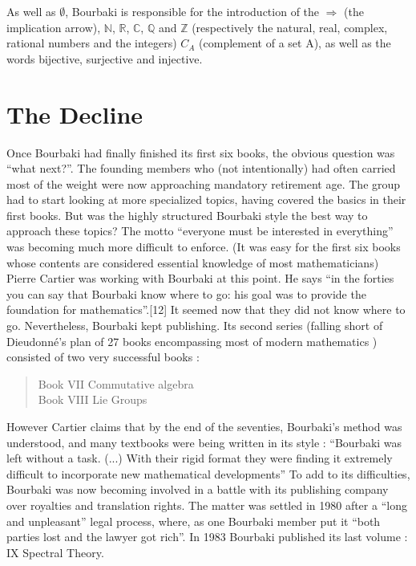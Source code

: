 \documentclass[12pt]{article}
\begin{document}
As well as $\emptyset$, Bourbaki is responsible for the introduction of 
the $\Rightarrow$ (the implication arrow), $\mathbb{N}$, $\mathbb{R}$, 
$\mathbb{C}$, $\mathbb{Q}$ and $\mathbb{Z}$ (respectively the natural, 
real, complex, rational numbers and the integers) $C_A$ (complement of 
a set A), as well as the words bijective, surjective and injective.
\cite{DR} 


\section*{The Decline}\normalsize

Once Bourbaki had finally finished its first six books, the obvious 
question was ``what next?''. The founding members who (not intentionally) 
had often carried most of the weight were now approaching mandatory 
retirement age. The group had to start looking at more specialized 
topics, having covered the basics in their first books. But was the 
highly structured Bourbaki style the best way to approach these topics? 
The motto ``everyone must be interested in everything'' was becoming much 
more difficult to enforce. (It was easy for the first six books whose 
contents are considered essential knowledge of most mathematicians) 
Pierre Cartier was working with Bourbaki at this point. He says ``in 
the forties you can say that Bourbaki know where to go: his goal was 
to provide the foundation for mathematics''.[12] It seemed now that 
they did not know where to go. Nevertheless, Bourbaki kept publishing. 
Its second series (falling short of Dieudonn\'e's plan of 27 books 
encompassing most of modern mathematics \cite{BA}) consisted of two 
very successful books :
\begin{quote}
Book VII Commutative algebra\\
Book VIII Lie Groups
\end{quote}
However Cartier claims that by the end of the seventies, Bourbaki's 
method was understood, and many textbooks were being written in its 
style : ``Bourbaki was left without a task. (...) With their rigid 
format they were finding it extremely difficult to incorporate new 
mathematical developments''\cite{SM} To add to its difficulties, Bourbaki was 
now becoming involved in a battle with its publishing company over royalties 
and translation rights. The matter was settled in 1980 after a ``long and 
unpleasant'' legal process, where, as one Bourbaki member put it ``both 
parties lost and the lawyer got rich''\cite{SM}. In 1983 Bourbaki published 
its last volume : IX Spectral Theory.
\end{document}
